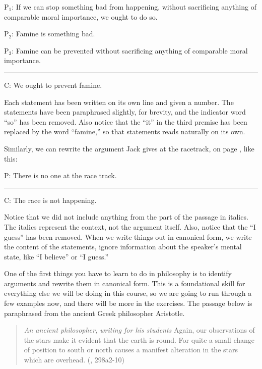 \begin{earg}
\item[P$_1$:] If we can stop something bad from happening, without sacrificing anything of comparable moral importance, we ought to do so. 
\item[P$_2$:] Famine is something bad.
\item[P$_3$:] Famine can be prevented without sacrificing anything of comparable moral importance.
\vspace{-.5em}
\item [] \rule{0.9\linewidth}{.5pt} 
\item[C:] We ought to prevent famine.
\end{earg} 

Each statement has been written on its own line and given a number. The statements have been paraphrased slightly, for brevity, and the indicator word ``so'' has been removed. Also notice that the ``it'' in the third premise has been replaced by the word ``famine,'' so that statements reads naturally on its own.  

Similarly, we can rewrite the argument Jack gives at the racetrack, on page \pageref{racetrack}, like this:

\begin{earg}
\item[P:] There is no one at the race track.
\vspace{-.5em}
\item [] \rule{0.4\linewidth}{.5pt} 
\item[C:] The race is not happening. 
\end{earg} 

Notice that we did not include anything from the part of the passage in italics. The italics represent the context, not the argument itself. Also, notice that the ``I guess'' has been removed. When we write things out in canonical form, we write the content of the statements, ignore information about the speaker's mental state, like ``I believe'' or ``I guess.'' 

One of the first things you have to learn to do in philosophy is to identify arguments and rewrite them in canonical form. This is a foundational skill for everything else we will be doing in this course, so we are going to run through a few examples now, and there will be more in the exercises. The passage below is paraphrased from the ancient Greek philosopher Aristotle. 

\begin{quotation}\noindent \textit{An ancient philosopher, writing for his students} Again, our observations of the stars make it evident that the earth is round. For quite a small change of position to south or north causes a manifest alteration in the stars which are overhead. (\cite{Aristotle:heavens}, 298a2-10)
\label{on_the_heavens} \end{quotation}

